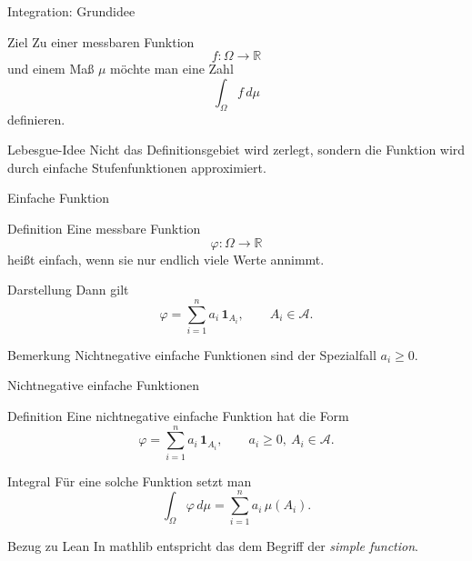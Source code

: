\documentclass{beamer}
\begin{document}
\begin{frame}{Integration: Grundidee}
\begin{block}{Ziel}
Zu einer messbaren Funktion
\[
f\colon \Omega\to\mathbb R
\]
und einem Maß \(\mu\) möchte man eine Zahl
\[
\int_\Omega f\,d\mu
\]
definieren.
\end{block}

\begin{block}{Lebesgue-Idee}
Nicht das Definitionsgebiet wird zerlegt, sondern die Funktion wird durch einfache Stufenfunktionen approximiert.
\end{block}
\end{frame}

\begin{frame}{Einfache Funktion}
\begin{block}{Definition}
Eine messbare Funktion
\[
\varphi\colon \Omega\to\mathbb R
\]
hei\ss{}t einfach, wenn sie nur endlich viele Werte annimmt.
\end{block}

\begin{block}{Darstellung}
Dann gilt
\[
\varphi=\sum_{i=1}^n a_i\,\mathbf 1_{A_i},
\qquad A_i\in\mathcal A.
\]
\end{block}

\begin{block}{Bemerkung}
Nichtnegative einfache Funktionen sind der Spezialfall \(a_i\ge 0\).
\end{block}
\end{frame}

\begin{frame}{Nichtnegative einfache Funktionen}
\begin{block}{Definition}
Eine nichtnegative einfache Funktion hat die Form
\[
\varphi=\sum_{i=1}^n a_i\,\mathbf 1_{A_i},
\qquad
a_i\ge 0,\ A_i\in\mathcal A.
\]
\end{block}

\begin{block}{Integral}
Für eine solche Funktion setzt man
\[
\int_\Omega \varphi\,d\mu
=
\sum_{i=1}^n a_i\,\mu(A_i).
\]
\end{block}

\begin{block}{Bezug zu Lean}
In mathlib entspricht das dem Begriff der \emph{simple function}.
\end{block}
\end{frame}

\end{document}
